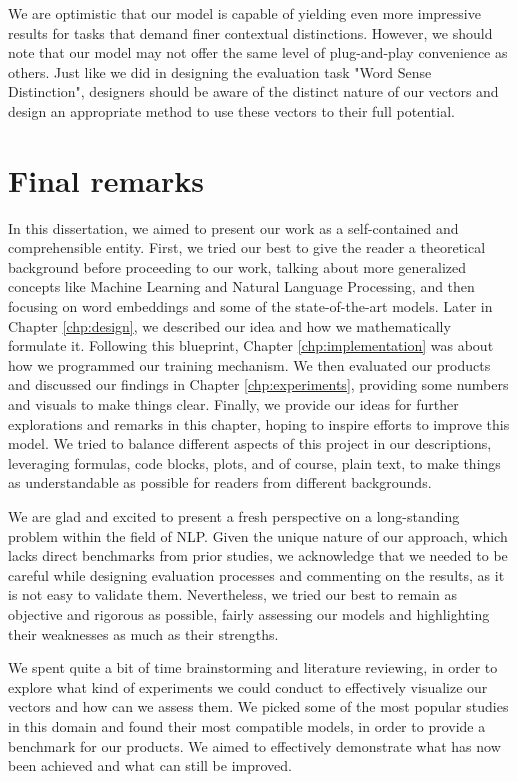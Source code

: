We are optimistic that our model is capable of yielding even more impressive results for tasks that demand finer contextual distinctions. However, we should note that our model may not offer the same level of plug-and-play convenience as others. Just like we did in designing the evaluation task "Word Sense Distinction", designers should be aware of the distinct nature of our vectors and design an appropriate method to use these vectors to their full potential.

\newpage
\section{Final remarks}

In this dissertation, we aimed to present our work as a self-contained and comprehensible entity. First, we tried our best to give the reader a theoretical background before proceeding to our work, talking about more generalized concepts like Machine Learning and Natural Language Processing, and then focusing on word embeddings and some of the state-of-the-art models. Later in Chapter \ref{chp:design}, we described our idea and how we mathematically formulate it. Following this blueprint, Chapter \ref{chp:implementation} was about how we programmed our training mechanism. We then evaluated our products and discussed our findings in Chapter \ref{chp:experiments}, providing some numbers and visuals to make things clear. Finally, we provide our ideas for further explorations and remarks in this chapter, hoping to inspire efforts to improve this model. We tried to balance different aspects of this project in our descriptions, leveraging formulas, code blocks, plots, and of course, plain text, to make things as understandable as possible for readers from different backgrounds.

We are glad and excited to present a fresh perspective on a long-standing problem within the field of \ac{NLP}. Given the unique nature of our approach, which lacks direct benchmarks from prior studies, we acknowledge that we needed to be careful while designing evaluation processes and commenting on the results, as it is not easy to validate them. Nevertheless, we tried our best to remain as objective and rigorous as possible, fairly assessing our models and highlighting their weaknesses as much as their strengths.

We spent quite a bit of time brainstorming and literature reviewing, in order to explore what kind of experiments we could conduct to effectively visualize our vectors and how can we assess them. We picked some of the most popular studies in this domain and found their most compatible models, in order to provide a benchmark for our products. We aimed to effectively demonstrate what has now been achieved and what can still be improved.

